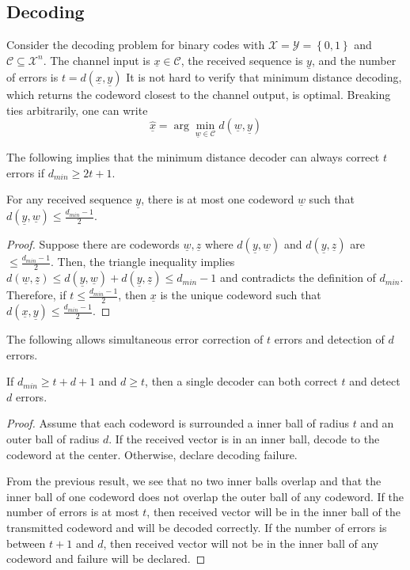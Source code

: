 \subsection{Decoding}

Consider the decoding problem for binary codes with $\mathcal{X}=\mathcal{Y}=\left\{ 0,1\right\} $ and $\mathcal{C}\subseteq\mathcal{X}^{n}$.
The channel input is $\underline{x}\in\mathcal{C}$, the received sequence is $\underline{y}$, and the number of errors is $t=d(\underline{x},\underline{y})$
It is not hard to verify that minimum distance decoding, which returns the codeword closest to the channel output, is optimal.
Breaking ties arbitrarily, one can write
\[ \hat{\underline{x}}=\arg\min_{\underline{w}\in\mathcal{C}}d(\underline{w},\underline{y})\]

The following implies that the minimum distance decoder can always correct $t$ errors if $d_{min}\geq2t+1$.
\begin{proposition}
For any received sequence $\underline{y}$, there is at most one codeword $\underline{w}$ such that $d(\underline{y},\underline{w})\leq\frac{d_{min}-1}{2}$.
\end{proposition}
\begin{proof}
Suppose there are codewords $\underline{w},\underline{z}$ where $d(\underline{y},\underline{w})$ and $d(\underline{y},\underline{z})$
are $\leq\frac{d_{min}-1}{2}$.
Then, the triangle inequality implies $d(\underline{w},\underline{z})\!\leq\! d(\underline{y},\underline{w})\!+\! d(\underline{y},\underline{z})\!\leq\! d_{min}-1$ and contradicts the definition of $d_{min}$.
Therefore, if $t\leq\frac{d_{min}-1}{2}$, then $\underline{x}$ is the unique codeword such that $d(\underline{x},\underline{y})\leq\frac{d_{min}-1}{2}$.
\end{proof}

The following allows simultaneous error correction of $t$ errors and detection of $d$ errors.
\begin{proposition}
If $d_{min}\geq t+d+1$ and $d\geq t$, then a single decoder can
both correct $t$ and detect $d$ errors.
\end{proposition}
\begin{proof}
Assume that each codeword is surrounded a inner ball of radius $t$ and an outer ball of radius $d$.
If the received vector is in an inner ball, decode to the codeword at the center.
Otherwise, declare decoding failure.

From the previous result, we see that no two inner balls overlap and that the inner ball of one codeword does not overlap the outer ball of any codeword.
If the number of errors is at most $t$, then received vector will be in the inner ball of the transmitted codeword and will be decoded correctly.
If the number of errors is between $t+1$ and $d$, then received vector will not be in the inner ball of any codeword and failure will be declared.
\end{proof}

